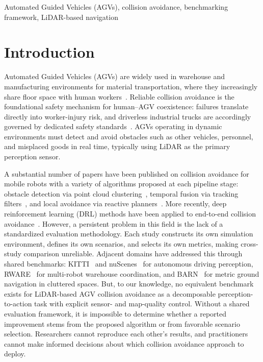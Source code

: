 \documentclass[conference]{IEEEtran}
\begin{document}
\vspace{-3pt}

\begin{IEEEkeywords}
Automated Guided Vehicles (AGVs), collision avoidance, benchmarking framework, LiDAR-based navigation 
\end{IEEEkeywords}
 
\section{Introduction}
\label{sec:introduction}
 
Automated Guided Vehicles (AGVs) are widely used in warehouse and manufacturing environments for material transportation, where they increasingly share floor space with human workers~\cite{fragapane2021planning}. Reliable collision avoidance is the foundational safety mechanism for human--AGV coexistence: failures translate directly into worker-injury risk, and driverless industrial trucks are accordingly governed by dedicated safety standards~\cite{iso3691-4}.
AGVs operating in dynamic environments must detect and avoid obstacles such as other vehicles, personnel, and misplaced goods in real time, typically using LiDAR as the primary perception sensor.

A substantial number of papers have been published on collision avoidance for mobile robots with a variety of algorithms proposed at each pipeline stage: obstacle detection via point cloud clustering~\cite{rusu2011pcl}, temporal fusion via tracking filters~\cite{welch1995kalman}, and local avoidance via reactive planners~\cite{borenstein1991vfh, fox1997dwa}. More recently, deep reinforcement learning (DRL) methods have been applied to end-to-end collision avoidance~\cite{qin2023endtoend}.
However, a persistent problem in this field is the lack of a standardized evaluation methodology. Each study constructs its own simulation environment, defines its own scenarios, and selects its own metrics, making cross-study comparison unreliable. Adjacent domains have addressed this through shared benchmarks: KITTI~\cite{geiger2012kitti} and nuScenes~\cite{caesar2020nuscenes} for autonomous driving perception, RWARE~\cite{papoudakis2021benchmarking} for multi-robot warehouse coordination, and BARN~\cite{perille2020barn} for metric ground navigation in cluttered spaces. But, to our knowledge, no equivalent benchmark exists for LiDAR-based AGV collision avoidance as a decomposable perception-to-action task with explicit sensor- and map-quality control.
Without a shared evaluation framework, it is impossible to determine whether a reported improvement stems from the proposed algorithm or from favorable scenario selection. Researchers cannot reproduce each other's results, and practitioners cannot make informed decisions about which collision avoidance approach to deploy.
\end{document}
